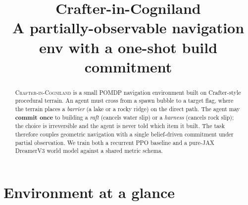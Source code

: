 \documentclass[11pt]{article}
\title{\textbf{Crafter-in-Cogniland}\\[2pt]
\large A partially-observable navigation env with a one-shot build commitment}
\author{}
\date{}
\begin{document}
\maketitle
\vspace{-2.2em}

\begin{abstract}\noindent
\textsc{Crafter-in-Cogniland} is a small POMDP navigation environment built on
Crafter-style procedural terrain. An agent must cross from a spawn bubble to a
target flag, where the terrain places a \emph{barrier} (a lake or a rocky
ridge) on the direct path. The agent may \textbf{commit once} to building a
\emph{raft} (cancels water slip) or a \emph{harness} (cancels rock slip); the
choice is irreversible and the agent is never told which item it built. The
task therefore couples geometric navigation with a single belief-driven
commitment under partial observation. We train both a recurrent PPO baseline
and a pure-JAX DreamerV3 world model against a shared metric schema.
\end{abstract}

\section{Environment at a glance}
\end{document}
